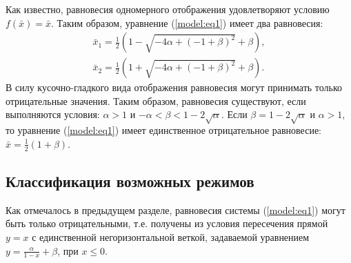 \documentclass[a4paper, 14pt]{extreport}
\numberwithin{equation}{section}
\numberwithin{figure}{section}
\numberwithin{table}{section}
\begin{document}
		Как известно, равновесия одномерного отображения удовлетворяют условию $ f(\bar{x}) = \bar{x} $. Таким образом, уравнение (\ref{model:eq1})  имеет два равновесия:
		\begin{equation}
			\begin{array}{l}
				\bar{x}_{1} = \frac{1}{2} \left(1-\sqrt{-4 \alpha+(-1+\beta)^2}+\beta\right), \\[3mm]
				\bar{x}_{2} =  \frac{1}{2} \left(1+\sqrt{-4 \alpha+(-1+\beta)^2}+\beta\right).
			\end{array}
		\end{equation} %
		В силу кусочно-гладкого вида отображения равновесия могут принимать только отрицательные значения. Таким образом, равновесия существуют, если выполняются условия: $ \alpha > 1 $ и $- \alpha < \beta < 1 - 2 \sqrt{\alpha} $. Если $ \beta = 1 - 2 \sqrt{\alpha} $ и $ \alpha > 1 $, то уравнение (\ref{model:eq1}) имеет единственное отрицательное равновесие: $ \bar{x} = \frac{1}{2} (1 + \beta) $.%

	\subsection{Классификация возможных режимов}
	\label{equilibriums_location}
		Как отмечалось в предыдущем разделе, равновесия системы (\ref{model:eq1}) могут быть только отрицательными, т.е. получены из условия пересечения прямой $ y = x $ с единственной негоризонтальной веткой, задаваемой уравнением $ y = \frac{\alpha}{1 - x} + \beta $, при $ x \leq 0 $. %
\end{document}
